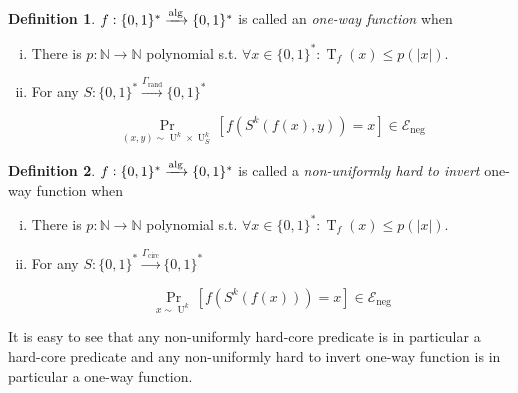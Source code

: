 \documentclass{article}
\numberwithin{equation}{section}
\theoremstyle{definition}
\newtheorem{definition}{Definition}[section]
\theoremstyle{plain}
\newcommand{\Bool}{\{0,1\}}
\newcommand{\Words}{{\Bool^*}}
\DeclareMathOperator{\Prb}{Pr}
\DeclareMathOperator{\T}{T}
\DeclareMathOperator{\Un}{U}
\newcommand{\Nats}{\mathbb{N}}
\newcommand{\Abs}[1]{\lvert #1 \rvert}
\newcommand{\Fall}{\mathcal{E}}
\newcommand{\Alg}{\xrightarrow{\textnormal{alg}}}
\begin{document}
\begin{samepage}
\begin{definition}

$f: \Words \Alg \Words$ is called an \emph{one-way function}
when

\begin{enumerate}[(i)]

\item There is $p: \Nats \rightarrow \Nats$ polynomial s.t. $\forall x \in \Words: \T_f(x) \leq p(\Abs{x})$.

\item For any $S: \Words \xrightarrow{\Gamma_{\text{rand}}} \Words$

\begin{equation}
\Prb_{(x,y) \sim \Un^k \times \Un_S^k}[f(S^k(f(x),y))=x] \in \Fall_{\text{neg}}
\end{equation}

\end{enumerate}

\end{definition}
\end{samepage}

\begin{samepage}
\begin{definition}

$f: \Words \Alg \Words$ is called a \emph{non-uniformly hard to invert} one-way function
when

\begin{enumerate}[(i)]

\item There is $p: \Nats \rightarrow \Nats$ polynomial s.t. $\forall x \in \Words: \T_f(x) \leq p(\Abs{x})$.

\item For any $S: \Words \xrightarrow{\Gamma_{\text{circ}}} \Words$

\begin{equation}
\Prb_{x \sim \Un^k}[f(S^k(f(x)))=x] \in \Fall_{\text{neg}}
\end{equation}

\end{enumerate}

\end{definition}
\end{samepage}

It is easy to see that any non-uniformly hard-core predicate is in particular a hard-core predicate and any non-uniformly hard to invert one-way function is in particular a one-way function.
\end{document}
